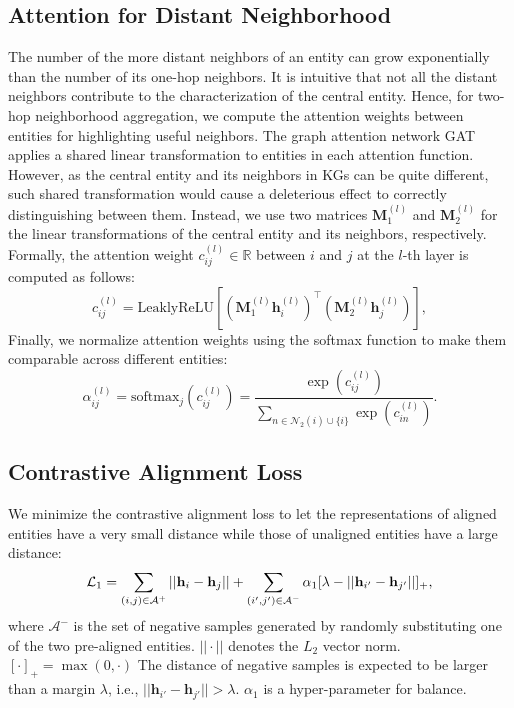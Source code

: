 \documentclass[letterpaper]{article} \usepackage{aaai20}  \usepackage{times}  \usepackage{helvet} \usepackage{courier}  \usepackage[hyphens]{url}  \usepackage{graphicx} \urlstyle{rm} \def\UrlFont{\rm}  \frenchspacing  \setlength{\pdfpagewidth}{8.5in}  \setlength{\pdfpageheight}{11in}  \usepackage{amsmath}
\begin{document}
\subsection{Attention for Distant Neighborhood}
The number of the more distant neighbors of an entity can grow exponentially than the number of its one-hop neighbors. It is intuitive that not all the distant neighbors contribute to the characterization of the central entity. Hence, for two-hop neighborhood aggregation, we compute the attention weights between entities for highlighting useful neighbors. The graph attention network GAT \cite{GAT} applies a shared linear transformation to entities in each attention function. However, as the central entity and its neighbors in KGs can be quite different, such shared transformation would cause a deleterious effect to correctly distinguishing between them. Instead, we use two matrices $\mathbf{M}_1^{(l)}$ and $\mathbf{M}_2^{(l)}$ for the linear transformations of the central entity and its neighbors, respectively. Formally, the attention weight $c_{ij}^{(l)}\in \mathbb{R}$ between $i$ and $j$ at the $l$-th layer is computed as follows:
\begin{equation} 
\label{eq:my_atten}
c_{ij}^{(l)} = \text{LeaklyReLU}[(\mathbf{M}_1^{(l)} \mathbf{h}_{i}^{(l)})^{\top}(\mathbf{M}_2^{(l)} \mathbf{h}_{j}^{(l)})],
\end{equation}
Finally, we normalize attention weights using the softmax function to make them comparable across different entities:
\begin{equation} 
\label{eq:atten_soft}
\alpha^{(l)}_{ij} = \text{softmax}_j(c^{(l)}_{ij})=\frac{\exp(c^{(l)}_{ij})}{\sum_{n\in\mathcal{N}_2(i)\cup \{i\}}\exp(c^{(l)}_{in})}.
\end{equation}

\subsection{Contrastive Alignment Loss}
We minimize the contrastive alignment loss to let the representations of aligned entities have a very small distance while those of unaligned entities have a large distance: 
\begin{equation}\label{eq:ali_loss}\small
	\mathcal{L}_1 = \sum_{(i,j) \in \mathcal{A}^{+}}||\mathbf{h}_i - \mathbf{h}_j|| + \sum_{(i',j') \in \mathcal{A}^{-}}\alpha_1[\lambda - || \mathbf{h}_{i'} - \mathbf{h}_{j'}||]_+,
\end{equation}
where $\mathcal{A}^{-}$ is the set of negative samples generated by randomly substituting one of the two pre-aligned entities. $||\cdot||$ denotes the $L_2$ vector norm. $[\cdot]_+=\max(0,\cdot)$ The distance of negative samples is expected to be larger than a margin $\lambda$, i.e., $|| \mathbf{h}_{i'} - \mathbf{h}_{j'}||>\lambda$. $\alpha_1$ is a hyper-parameter for balance.
	
\end{document}
